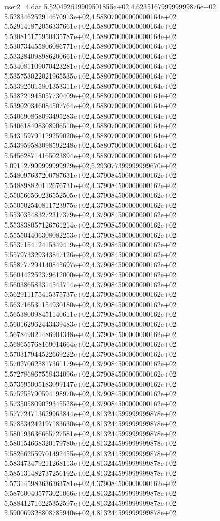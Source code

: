 \begin{filecontents}{user2_4.dat}
5.520492619909501855e+02,4.623516799999999876e+02
5.528346252914670913e+02,4.588070000000000164e+02
5.529141872056337661e+02,4.588070000000000164e+02
5.530815175950435787e+02,4.588070000000000164e+02
5.530734455806086771e+02,4.588070000000000164e+02
5.533284098986200661e+02,4.588070000000000164e+02
5.534081109070423281e+02,4.588070000000000164e+02
5.535753022021965535e+02,4.588070000000000164e+02
5.533925015801353311e+02,4.588070000000000164e+02
5.538221945057730409e+02,4.588070000000000164e+02
5.539020346084507764e+02,4.588070000000000164e+02
5.540690868093495283e+02,4.588070000000000164e+02
5.540618498308906510e+02,4.588070000000000164e+02
5.543159791129259020e+02,4.588070000000000164e+02
5.543959583098592248e+02,4.588070000000000164e+02
5.545628714165023894e+02,4.588070000000000164e+02
5.091127999999999929e+02,5.293077399999999670e+02
5.548097637200787631e+02,4.379084500000000162e+02
5.548898820112676731e+02,4.379084500000000162e+02
5.550566560236552505e+02,4.379084500000000162e+02
5.550502540811723975e+02,4.379084500000000162e+02
5.553035483272317379e+02,4.379084500000000162e+02
5.553838057126761214e+02,4.379084500000000162e+02
5.555504406308082253e+02,4.379084500000000162e+02
5.553715412415349419e+02,4.379084500000000162e+02
5.557973329343847126e+02,4.379084500000000162e+02
5.558777294140845697e+02,4.379084500000000162e+02
5.560442252379612000e+02,4.379084500000000162e+02
5.560386583314543714e+02,4.379084500000000162e+02
5.562911175415375737e+02,4.379084500000000162e+02
5.563716531154930180e+02,4.379084500000000162e+02
5.565380098451140611e+02,4.379084500000000162e+02
5.560162962443439483e+02,4.379084500000000162e+02
5.567849021486904348e+02,4.379084500000000162e+02
5.568655768169014664e+02,4.379084500000000162e+02
5.570317944522669222e+02,4.379084500000000162e+02
5.570270625817361179e+02,4.379084500000000162e+02
5.572786867558434096e+02,4.379084500000000162e+02
5.573595005183099147e+02,4.379084500000000162e+02
5.575255790594198970e+02,4.379084500000000162e+02
5.573505809029345528e+02,4.379084500000000162e+02
5.577724713629963844e+02,4.813244599999999878e+02
5.578534242197183630e+02,4.813244599999999878e+02
5.580193636665727581e+02,4.813244599999999878e+02
5.580154668320179780e+02,4.813244599999999878e+02
5.582662559701492455e+02,4.813244599999999878e+02
5.583473479211268113e+02,4.813244599999999878e+02
5.585131482737256192e+02,4.813244599999999878e+02
5.573145983636363781e+02,4.379084500000000162e+02
5.587600405773021066e+02,4.813244599999999878e+02
5.588412716225352597e+02,4.813244599999999878e+02
5.590069328808785940e+02,4.813244599999999878e+02

\end{filecontents}
